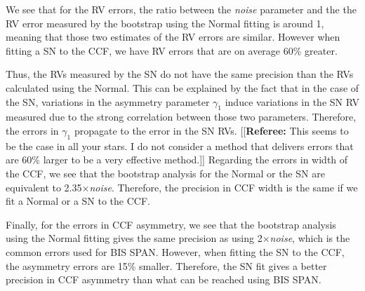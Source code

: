 \documentclass[11pt, oneside]{article}
\newcommand{\comment}[1]{{\color{red}[[\textbf{Referee: }#1]]}}
\begin{document}
We see that for the RV errors, the ratio between the \emph{noise} parameter and the the RV error measured by the bootstrap using the Normal fitting is around 1, meaning that those two estimates of the RV errors are similar. However when fitting a SN to the CCF, we have RV errors that are on average 60\% greater. 

Thus, the RVs measured by the SN do not have the same precision than the RVs calculated using the Normal. This can be explained by the fact that in the case of the SN, variations in the asymmetry parameter $\gamma_1$ induce variations in the SN RV measured due to the strong correlation between those two parameters. Therefore, the errors in $\gamma_1$ propagate to the error in the SN RVs.
\comment{This seems to be the case in all your stars. I do not consider a method that delivers errors that are 60\% larger to be a very effective method.}
Regarding the errors in width of the CCF, we see that the bootstrap analysis for the Normal or the SN are equivalent to 2.35$\times$\emph{noise}. Therefore, the precision in CCF width is the same if we fit a Normal or a SN to the CCF.

Finally, for the errors in CCF asymmetry, we see that the bootstrap analysis using the Normal fitting gives the same precision as using 2$\times$\emph{noise}, which is the common errors used for BIS SPAN. However, when fitting the SN to the CCF, the asymmetry errors are 15\% smaller. Therefore, the SN fit gives a better precision in CCF asymmetry than what can be reached using BIS SPAN.
\end{document}
